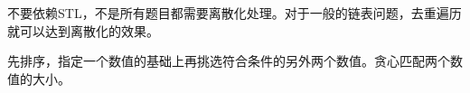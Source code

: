 不要依赖STL，不是所有题目都需要离散化处理。对于一般的链表问题，去重遍历就可以达到离散化的效果。\par

先排序，指定一个数值的基础上再挑选符合条件的另外两个数值。贪心匹配两个数值的大小。\par
